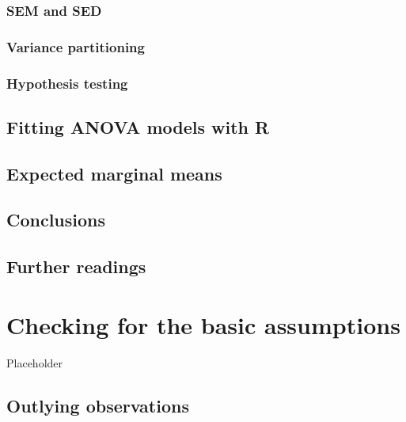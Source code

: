 \documentclass[a4paper,12pt,oneside]{book}
\begin{document}
\hypertarget{sem-and-sed}{%
\subsection{SEM and SED}\label{sem-and-sed}}

\hypertarget{variance-partitioning}{%
\subsection{Variance partitioning}\label{variance-partitioning}}

\hypertarget{hypothesis-testing}{%
\subsection{Hypothesis testing}\label{hypothesis-testing}}

\hypertarget{fitting-anova-models-with-r}{%
\section{Fitting ANOVA models with R}\label{fitting-anova-models-with-r}}

\hypertarget{expected-marginal-means}{%
\section{Expected marginal means}\label{expected-marginal-means}}

\hypertarget{conclusions-4}{%
\section{Conclusions}\label{conclusions-4}}

\hypertarget{further-readings-5}{%
\section{Further readings}\label{further-readings-5}}

\hypertarget{checking-for-the-basic-assumptions}{%
\chapter{Checking for the basic assumptions}\label{checking-for-the-basic-assumptions}}

Placeholder

\hypertarget{outlying-observations}{%
\section{Outlying observations}\label{outlying-observations}}
\end{document}
